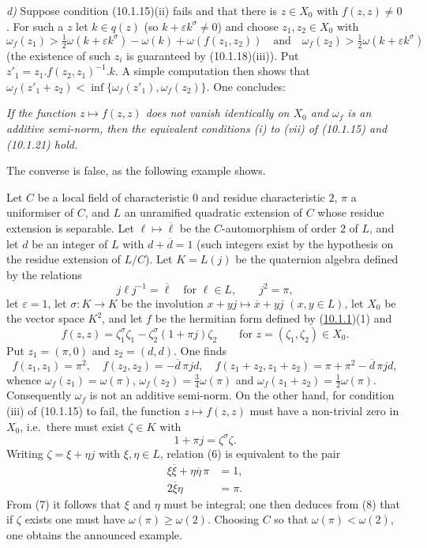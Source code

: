\documentclass[12pt,a4paper,oneside,english]{smfart}
\newcommand{\btref}[1]{\hyperlink{bt:#1}{#1}}
\theoremstyle{definition}
\theoremstyle{bt}
\begin{document}
\emph{d)} Suppose condition (10.1.15)(ii) fails and that there is $z\in X_0$
with $f(z,z)\neq0$. For such a $z$ let $k\in q(z)$ (so
$k+\varepsilon k^{\sigma}\neq0$) and choose $z_1,z_2\in X_0$ with
\[
\omega_f(z_1)>\tfrac12\omega(k+\varepsilon k^{\sigma})-\omega(k)+\omega(f(z_1,z_2))
\quad\text{and}\quad
\omega_f(z_2)>\tfrac12\omega(k+\varepsilon k^{\sigma})
\]
(the existence of such $z_i$ is guaranteed by (10.1.18)(iii)). Put
$z'_1=z_1.f(z_2,z_1)^{-1}.k$. A simple computation then shows that
$\omega_f(z'_1+z_2)<\inf\{\omega_f(z'_1),\omega_f(z_2)\}$. One concludes:

\emph{If the function $z\mapsto f(z,z)$ does not vanish identically on $X_0$ and
$\omega_f$ is an additive semi-norm, then the equivalent conditions (i) to (vii)
of (10.1.15) and (10.1.21) hold.}

\smallskip
The converse is false, as the following example shows.

\smallskip
Let $C$ be a local field of characteristic $0$ and residue characteristic $2$,
$\pi$ a uniformiser of $C$, and $L$ an unramified quadratic extension of $C$
whose residue extension is separable. Let $\ell\mapsto\overline\ell$ be the
$C$-automorphism of order $2$ of $L$, and let $d$ be an integer of $L$ with
$d+\overline d=1$ (such integers exist by the hypothesis on the residue
extension of $L/C$). Let $K=L(j)$ be the quaternion algebra defined by the
relations
\[
j\ell j^{-1}=\overline\ell\quad\text{for }\ell\in L,
\qquad j^{2}=\pi,
\]
let $\varepsilon=1$, let $\sigma:K\to K$ be the involution
$x+yj\mapsto\overline x+yj$ $(x,y\in L)$, let $X_0$ be the vector space $K^{2}$,
and let $f$ be the hermitian form defined by (\btref{10.1.1})(1) and
\[
f(z,z)=\zeta_1^{\sigma}\zeta_1-\zeta_2^{\sigma}(1+\pi j)\zeta_2
\qquad\text{for } z=(\zeta_1,\zeta_2)\in X_0 .
\]
Put $z_1=(\pi,0)$ and $z_2=(d,d)$. One finds
\[
f(z_1,z_1)=\pi^{2},\quad f(z_2,z_2)=-\overline d\,\pi j d,\quad f(z_1+z_2,z_1+z_2)=\pi+\pi^{2}-\overline d\,\pi j d,
\]
whence $\omega_f(z_1)=\omega(\pi)$, $\omega_f(z_2)=\tfrac34\omega(\pi)$ and
$\omega_f(z_1+z_2)=\tfrac12\omega(\pi)$. Consequently $\omega_f$ is not an
additive semi-norm. On the other hand, for condition (iii) of (10.1.15) to fail,
the function $z\mapsto f(z,z)$ must have a non-trivial zero in $X_0$, i.e.\
there must exist $\zeta\in K$ with
\begin{equation}
1+\pi j=\zeta^{\sigma}\zeta. \tag{6}
\end{equation}
Writing $\zeta=\xi+\eta j$ with $\xi,\eta\in L$, relation (6) is equivalent to
the pair
\begin{align}
\xi\overline\xi+\eta\overline\eta\,\pi&=1, \tag{7}\\
2\overline\xi\eta&=\pi. \tag{8}
\end{align}
From (7) it follows that $\xi$ and $\eta$ must be integral; one then deduces
from (8) that if $\zeta$ exists one must have $\omega(\pi)\ge\omega(2)$.
Choosing $C$ so that $\omega(\pi)<\omega(2)$, one obtains the announced example.
\end{document}
